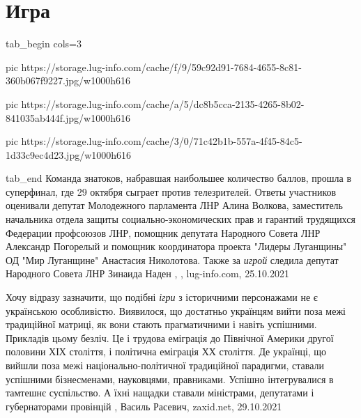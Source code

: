  
 
 
 
 
\chapter{Игра}
\label{sec:slova.igra}

\ifcmt
  tab_begin cols=3

     pic https://storage.lug-info.com/cache/f/9/59c92d91-7684-4655-8c81-360b067f9227.jpg/w1000h616

     pic https://storage.lug-info.com/cache/a/5/dc8b5cca-2135-4265-8b02-841035ab444f.jpg/w1000h616

     pic https://storage.lug-info.com/cache/3/0/71c42b1b-557a-4f45-84c5-1d33c9ec4d23.jpg/w1000h616

  tab_end
\fi
Команда знатоков, набравшая наибольшее количество баллов, прошла в суперфинал,
где 29 октября сыграет против телезрителей.  Ответы участников оценивали
депутат Молодежного парламента ЛНР Алина Волкова, заместитель начальника отдела
защиты социально-экономических прав и гарантий трудящихся Федерации профсоюзов
ЛНР, помощник депутата Народного Совета ЛНР Александр Погорелый и помощник
координатора проекта "Лидеры Луганщины" ОД "Мир Луганщине" Анастасия
Николотова. Также за \emph{игрой} следила депутат Народного Совета ЛНР Зинаида
Наден
, 
, lug-info.com, 25.10.2021

Хочу відразу зазначити, що подібні \emph{ігри} з історичними персонажами не є
українською особливістю. Виявилося, що достатньо українцям вийти поза межі
традиційної матриці, як вони стають прагматичними і навіть успішними. Прикладів
цьому безліч. Це і трудова еміграція до Північної Америки другої половини ХІХ
століття, і політична еміграція ХХ століття. Де українці, що вийшли поза межі
національно-політичної традиційної парадигми, ставали успішними бізнесменами,
науковцями, правниками. Успішно інтегрувалися в тамтешнє суспільство. А їхні
нащадки ставали міністрами, депутатами і губернаторами провінцій
, 
Василь Расевич, zaxid.net, 29.10.2021

